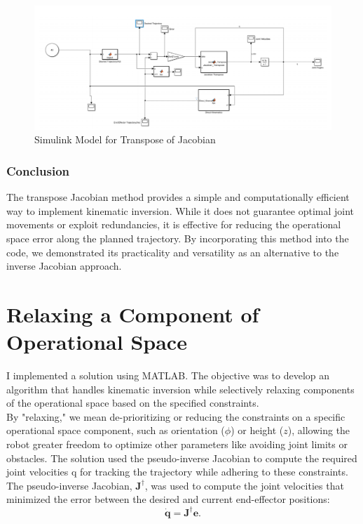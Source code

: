 \documentclass[12pt]{report}
\begin{document}
		\hspace{-10mm}
			\begin{figure}[H]
			\hspace{-15mm}
			\includegraphics[scale=0.9]{S3} %
			\caption{Simulink Model for Transpose of Jacobian}
			\label{run10} %
		\end{figure}
		
		\subsection{Conclusion}
		The transpose Jacobian method provides a simple and computationally efficient way to implement kinematic inversion. While it does not guarantee optimal joint movements or exploit redundancies, it is effective for reducing the operational space error along the planned trajectory. By incorporating this method into the code, we demonstrated its practicality and versatility as an alternative to the inverse Jacobian approach.
		
	\chapter{Relaxing a Component of Operational Space}
I implemented a solution using MATLAB. The objective was to develop an algorithm that handles kinematic inversion while selectively relaxing components of the operational space based on the specified constraints. \\By "relaxing," we mean de-prioritizing or reducing the constraints on a specific operational space component, such as orientation (\(\phi\)) or height (\(z\)), allowing the robot greater freedom to optimize other parameters like avoiding joint limits or obstacles. The solution used the pseudo-inverse Jacobian to compute the required joint velocities q for tracking the trajectory while adhering to these constraints.\\The pseudo-inverse Jacobian, \(\mathbf{J}^\dagger\), was used to compute the joint velocities that minimized the error between the desired and current end-effector positions:
\[
\dot{\mathbf{q}} = \mathbf{J}^\dagger \mathbf{e}.
\]
\end{document}
